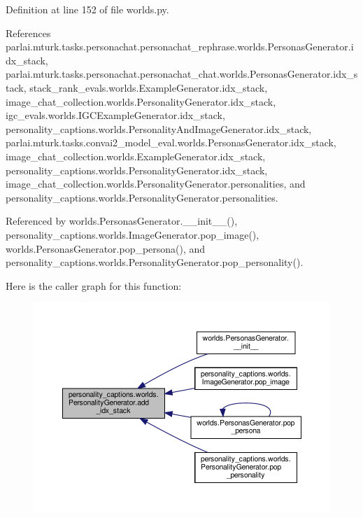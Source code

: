 Definition at line 152 of file worlds.\+py.



References parlai.\+mturk.\+tasks.\+personachat.\+personachat\+\_\+rephrase.\+worlds.\+Personas\+Generator.\+idx\+\_\+stack, parlai.\+mturk.\+tasks.\+personachat.\+personachat\+\_\+chat.\+worlds.\+Personas\+Generator.\+idx\+\_\+stack, stack\+\_\+rank\+\_\+evals.\+worlds.\+Example\+Generator.\+idx\+\_\+stack, image\+\_\+chat\+\_\+collection.\+worlds.\+Personality\+Generator.\+idx\+\_\+stack, igc\+\_\+evals.\+worlds.\+I\+G\+C\+Example\+Generator.\+idx\+\_\+stack, personality\+\_\+captions.\+worlds.\+Personality\+And\+Image\+Generator.\+idx\+\_\+stack, parlai.\+mturk.\+tasks.\+convai2\+\_\+model\+\_\+eval.\+worlds.\+Personas\+Generator.\+idx\+\_\+stack, image\+\_\+chat\+\_\+collection.\+worlds.\+Example\+Generator.\+idx\+\_\+stack, personality\+\_\+captions.\+worlds.\+Personality\+Generator.\+idx\+\_\+stack, image\+\_\+chat\+\_\+collection.\+worlds.\+Personality\+Generator.\+personalities, and personality\+\_\+captions.\+worlds.\+Personality\+Generator.\+personalities.



Referenced by worlds.\+Personas\+Generator.\+\_\+\+\_\+init\+\_\+\+\_\+(), personality\+\_\+captions.\+worlds.\+Image\+Generator.\+pop\+\_\+image(), worlds.\+Personas\+Generator.\+pop\+\_\+persona(), and personality\+\_\+captions.\+worlds.\+Personality\+Generator.\+pop\+\_\+personality().

Here is the caller graph for this function\+:
\nopagebreak
\begin{figure}[H]
\begin{center}
\leavevmode
\includegraphics[width=350pt]{classpersonality__captions_1_1worlds_1_1PersonalityGenerator_a78cf1854a907766176bd595a66e0b4c1_icgraph}
\end{center}
\end{figure}
\mbox{\label{classpersonality__captions_1_1worlds_1_1PersonalityGenerator_a5d77b6f2855f26f68832d81f4b84ba99}} 
